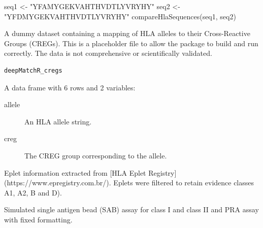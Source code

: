 \documentclass[letterpaper]{book}
\begin{document}
%
\begin{Examples}
\begin{ExampleCode}
seq1 <- "YFAMYGEKVAHTHVDTLYVRYHY"
seq2 <- "YFDMYGEKVAHTHVDTLYVRYHY"
compareHlaSequences(seq1, seq2)
\end{ExampleCode}
\end{Examples}
%
\begin{Description}
A dummy dataset containing a mapping of HLA alleles to their
Cross-Reactive Groups (CREGs). This is a placeholder file to allow the
package to build and run correctly. The data is not comprehensive or
scientifically validated.
\end{Description}
%
\begin{Usage}
\begin{verbatim}
deepMatchR_cregs
\end{verbatim}
\end{Usage}
%
\begin{Format}
A data frame with 6 rows and 2 variables:
\begin{description}

\item[allele] An HLA allele string.
\item[creg] The CREG group corresponding to the allele.

\end{description}

\end{Format}
%
\begin{Description}
Eplet information extracted from [HLA Eplet Registry](https://www.epregistry.com.br/).
Eplets were filtered to retain evidence classes A1, A2, B and D).
\end{Description}
%
\begin{Description}
Simulated single antigen bead (SAB) assay
for class I and class II and PRA assay
with fixed formatting.
\end{Description}
\end{document}

